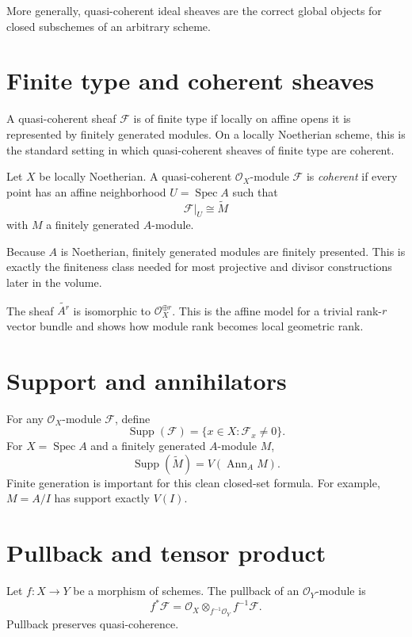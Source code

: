 More generally, quasi-coherent ideal sheaves are the correct global objects for closed subschemes of an arbitrary scheme.



\section{Finite type and coherent sheaves}
A quasi-coherent sheaf $\mathcal F$ is of finite type if locally on affine opens it is represented by finitely generated modules.  On a locally Noetherian scheme, this is the standard setting in which quasi-coherent sheaves of finite type are coherent.

\begin{definition}
Let $X$ be locally Noetherian.  A quasi-coherent $\mathcal O_X$-module $\mathcal F$ is \emph{coherent} if every point has an affine neighborhood $U=\operatorname{Spec}A$ such that
\[
\mathcal F|_U\cong\widetilde M
\]
with $M$ a finitely generated $A$-module.
\end{definition}

Because $A$ is Noetherian, finitely generated modules are finitely presented.  This is exactly the finiteness class needed for most projective and divisor constructions later in the volume.

\begin{example}\label{ex:vi33-expand-03}
The sheaf $\widetilde{A^r}$ is isomorphic to $\mathcal O_X^{\oplus r}$.  This is the affine model for a trivial rank-$r$ vector bundle and shows how module rank becomes local geometric rank.
\end{example}
\section{Support and annihilators}
For any $\mathcal O_X$-module $\mathcal F$, define
\[
\operatorname{Supp}(\mathcal F)=\{x\in X:\mathcal F_x\neq0\}.
\]
For $X=\operatorname{Spec}A$ and a finitely generated $A$-module $M$,
\[
\boxed{\operatorname{Supp}(\widetilde M)=V(\operatorname{Ann}_A M).}
\]
Finite generation is important for this clean closed-set formula.  For example, $M=A/I$ has support exactly $V(I)$.

\section{Pullback and tensor product}
Let $f:X\to Y$ be a morphism of schemes.  The pullback of an $\mathcal O_Y$-module is
\[
f^*\mathcal F=
\mathcal O_X\otimes_{f^{-1}\mathcal O_Y}f^{-1}\mathcal F.
\]
Pullback preserves quasi-coherence.

